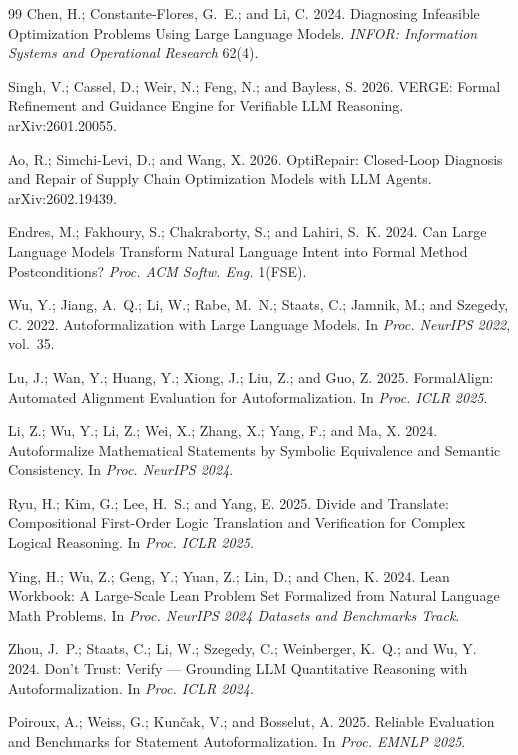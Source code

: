 \documentclass[letterpaper]{article}
\begin{document}
\begin{thebibliography}{99}
Chen, H.; Constante-Flores, G.~E.; and Li, C. 2024.
Diagnosing Infeasible Optimization Problems Using Large Language Models.
\textit{INFOR: Information Systems and Operational Research} 62(4).

Singh, V.; Cassel, D.; Weir, N.; Feng, N.; and Bayless, S. 2026.
VERGE: Formal Refinement and Guidance Engine for Verifiable LLM Reasoning.
arXiv:2601.20055.

Ao, R.; Simchi-Levi, D.; and Wang, X. 2026.
OptiRepair: Closed-Loop Diagnosis and Repair of Supply Chain Optimization
Models with LLM Agents. arXiv:2602.19439.

Endres, M.; Fakhoury, S.; Chakraborty, S.; and Lahiri, S.~K. 2024.
Can Large Language Models Transform Natural Language Intent into Formal
Method Postconditions? \textit{Proc. ACM Softw. Eng.} 1(FSE).

Wu, Y.; Jiang, A.~Q.; Li, W.; Rabe, M.~N.; Staats, C.; Jamnik, M.; and
Szegedy, C. 2022.
Autoformalization with Large Language Models.
In \textit{Proc. NeurIPS 2022}, vol.~35.

Lu, J.; Wan, Y.; Huang, Y.; Xiong, J.; Liu, Z.; and Guo, Z. 2025.
FormalAlign: Automated Alignment Evaluation for Autoformalization.
In \textit{Proc. ICLR 2025}.

Li, Z.; Wu, Y.; Li, Z.; Wei, X.; Zhang, X.; Yang, F.; and Ma, X. 2024.
Autoformalize Mathematical Statements by Symbolic Equivalence and
Semantic Consistency. In \textit{Proc. NeurIPS 2024}.

Ryu, H.; Kim, G.; Lee, H.~S.; and Yang, E. 2025.
Divide and Translate: Compositional First-Order Logic Translation and
Verification for Complex Logical Reasoning.
In \textit{Proc. ICLR 2025}.

Ying, H.; Wu, Z.; Geng, Y.; Yuan, Z.; Lin, D.; and Chen, K. 2024.
Lean Workbook: A Large-Scale Lean Problem Set Formalized from Natural
Language Math Problems. In \textit{Proc. NeurIPS 2024 Datasets and
Benchmarks Track}.

Zhou, J.~P.; Staats, C.; Li, W.; Szegedy, C.; Weinberger, K.~Q.; and
Wu, Y. 2024.
Don't Trust: Verify --- Grounding LLM Quantitative Reasoning with
Autoformalization. In \textit{Proc. ICLR 2024}.

Poiroux, A.; Weiss, G.; Kun\v{c}ak, V.; and Bosselut, A. 2025.
Reliable Evaluation and Benchmarks for Statement Autoformalization.
In \textit{Proc. EMNLP 2025}.


\end{thebibliography}
\end{document}
